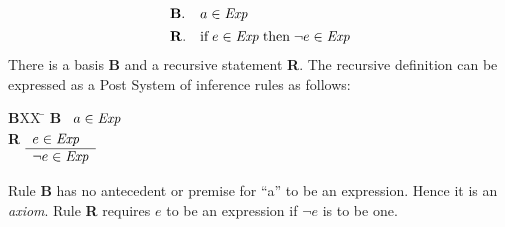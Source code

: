 \documentclass[12pt]{article}
\newcommand{\id}[1]{\mbox{\it #1\/}}
\newcommand{\rid}[1]{\mbox{\rm #1}}
\begin{document}





\[\begin{array}{ll}
{\bf B}. & a\in\id{Exp} \\[1ex]
{\bf R}. & \rid{if}\;e\in\id{Exp}\;\rid{then}\; \neg e\in\id{Exp}
\end{array}
\]
There is a basis {\bf B} and a recursive statement {\bf R}.
The recursive definition can be expressed as a Post System of inference rules as follows:
\begin{tabbing}
{\bf B}XX \=  \kill
{\bf B} \>
	\(\begin{array}[t]{l}
	a\in\id{Exp} 
	\end{array}\) \\[2ex]
{\bf R} \>
	\(\begin{array}[t]{l}
	e\in\id{Exp} \\
	\hline
	\neg e\in\id{Exp}
	\end{array}\) %
\end{tabbing}
Rule {\bf B} has no antecedent or premise for
``a'' to be an expression.
Hence it is an {\em axiom\/}.
Rule {\bf R} requires $e$ to be an expression if $\neg e$ is to be one.
\end{document}
